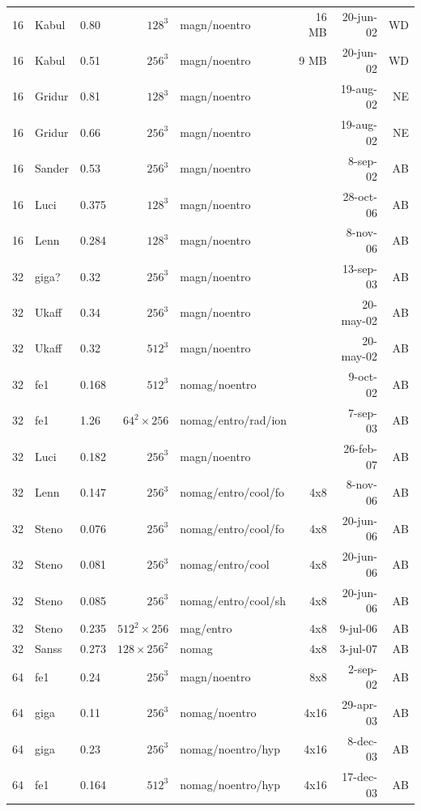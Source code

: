 \documentclass[\mydriver,12pt,twoside,notitlepage,a4paper]{article}
\begin{document}
\begin{center}
\begin{small}
\begin{longtable}{rllrlrrr}
  16 & Kabul & 0.80 & $128^3$ & magn/noentro &  16 MB & 20-jun-02 & WD \\
  16 & Kabul & 0.51 & $256^3$ & magn/noentro &   9 MB & 20-jun-02 & WD \\
  16 & Gridur& 0.81 & $128^3$ & magn/noentro &        & 19-aug-02 & NE \\
  16 & Gridur& 0.66 & $256^3$ & magn/noentro &        & 19-aug-02 & NE \\
  16 & Sander& 0.53 & $256^3$ & magn/noentro &        &  8-sep-02 & AB \\
  16 & Luci  & 0.375& $128^3$ & magn/noentro &        & 28-oct-06 & AB \\
  16 & Lenn  & 0.284& $128^3$ & magn/noentro &        &  8-nov-06 & AB \\
  32 & giga? & 0.32 & $256^3$ & magn/noentro &        & 13-sep-03 & AB \\
  32 & Ukaff & 0.34 & $256^3$ & magn/noentro &        & 20-may-02 & AB \\
  32 & Ukaff & 0.32 & $512^3$ & magn/noentro &        & 20-may-02 & AB \\
  32 & fe1   & 0.168& $512^3$ &nomag/noentro&        &  9-oct-02 & AB \\
  32 & fe1   & 1.26 & $64^2\times256$ &nomag/entro/rad/ion& & 7-sep-03 & AB \\
  32 & Luci  & 0.182& $256^3$ &magn/noentro &        & 26-feb-07 & AB \\
  32 & Lenn  & 0.147& $256^3$ &nomag/entro/cool/fo& 4x8 &  8-nov-06 & AB \\
  32 & Steno & 0.076& $256^3$ &nomag/entro/cool/fo& 4x8 & 20-jun-06 & AB \\
  32 & Steno & 0.081& $256^3$ &nomag/entro/cool& 4x8 & 20-jun-06 & AB \\
  32 & Steno & 0.085& $256^3$ &nomag/entro/cool/sh& 4x8 & 20-jun-06 & AB \\
  32 & Steno & 0.235& $512^2\times256$ &mag/entro& 4x8 &  9-jul-06 & AB \\
  32 & Sanss & 0.273& $128\times256^2$ &nomag& 4x8 &  3-jul-07 & AB \\
  64 & fe1   & 0.24 & $256^3$ & magn/noentro &  8x8   &  2-sep-02 & AB \\
  64 & giga  & 0.11 & $256^3$ &nomag/noentro&  4x16  & 29-apr-03 & AB \\
  64 & giga  & 0.23 & $256^3$ &nomag/noentro/hyp&4x16& 8-dec-03& AB \\
  64 & fe1   & 0.164& $512^3$ &nomag/noentro/hyp&4x16&17-dec-03& AB \\

\end{longtable}
\end{small}
\end{center}
\end{document}
